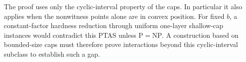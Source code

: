 The proof uses only the cyclic-interval property of the caps. In
particular it also applies when the nonwitness points alone are in
convex position. For fixed $b$, a constant-factor hardness reduction
through uniform one-layer shallow-cap instances would contradict
this PTAS unless $\mathrm P=\mathrm{NP}$. A construction based on
bounded-size caps must therefore prove interactions beyond this
cyclic-interval subclass to establish such a gap.
